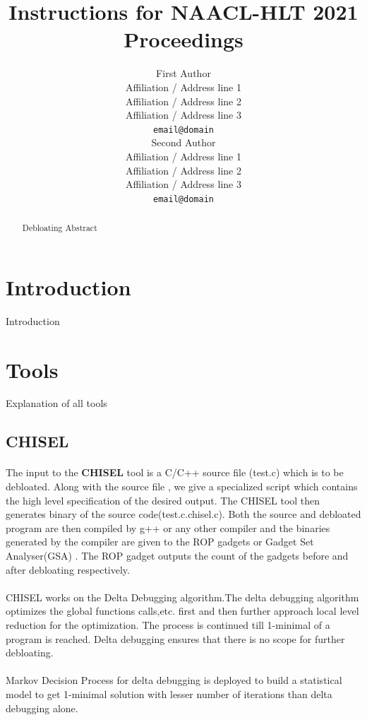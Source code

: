 \documentclass[9pt]{article}
\title{Instructions for NAACL-HLT 2021 Proceedings}
\author{First Author \\
  Affiliation / Address line 1 \\
  Affiliation / Address line 2 \\
  Affiliation / Address line 3 \\
  \texttt{email@domain} \\\And
  Second Author \\
  Affiliation / Address line 1 \\
  Affiliation / Address line 2 \\
  Affiliation / Address line 3 \\
  \texttt{email@domain} \\}
\begin{document}
\maketitle
\begin{abstract}
Debloating Abstract
\end{abstract}

\section{Introduction}
Introduction


\section{Tools}
Explanation of all tools 

\subsection{CHISEL}
\paragraph{}
The input to the \textbf{CHISEL} tool is a C/C++ source file (test.c) which is to be debloated. Along with the source file , we give a specialized script which contains the high level specification of the desired output. The CHISEL tool then generates binary of the source code(test.c.chisel.c). Both the source and debloated program are then compiled by g++ or any other compiler and the binaries generated by the compiler are given to the ROP gadgets or Gadget Set Analyser(GSA) . The ROP gadget outputs the count of the  gadgets before and after debloating respectively.

\paragraph{}
CHISEL works on the Delta Debugging algorithm.The delta debugging algorithm optimizes the global functions calls,etc. first and then further approach local level reduction for the optimization. The process is continued till 1-minimal of a program is reached. Delta debugging ensures that there is no scope for further debloating.

\paragraph{}
Markov Decision Process for delta debugging is deployed to build a statistical model to get 1-minimal solution with lesser number of iterations than delta debugging alone.
\end{document}
